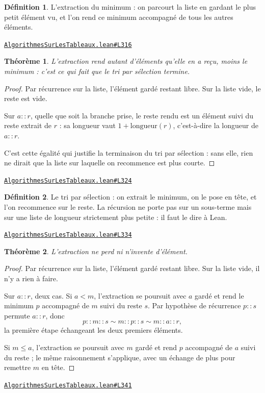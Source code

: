 \documentclass[11pt,a4paper]{article}
\theoremstyle{definition}
\newtheorem{definition}{Définition}
\theoremstyle{plain}
\newtheorem{theoreme}{Théorème}
\newcommand{\source}[2]{\par\smallskip\noindent\hfill{\footnotesize\href{#1}{\texttt{#2}}}\par\smallskip}
\begin{document}
\begin{definition}
L'extraction du minimum : on parcourt la liste en gardant le plus petit élément
vu, et l'on rend ce minimum accompagné de tous les autres éléments.
\end{definition}
\source{https://github.com/Commutator-IO/learn-lean/blob/main/courses/02-lycee/11-informatique-nsi/AlgorithmesSurLesTableaux.lean\#L316}{AlgorithmesSurLesTableaux.lean\#L316}

\begin{theoreme}
L'extraction rend autant d'éléments qu'elle en a reçu, moins le minimum : c'est
ce qui fait que le tri par sélection termine.
\end{theoreme}
\begin{proof}
Par récurrence sur la liste, l'élément gardé restant libre. Sur la liste vide, le reste
est vide.

Sur \(a :: r\), quelle que soit la branche prise, le reste rendu est un élément suivi du
reste extrait de \(r\) : sa longueur vaut \(1 + \mathrm{longueur}(r)\), c'est-à-dire la
longueur de \(a :: r\).

C'est cette égalité qui justifie la terminaison du tri par sélection : sans elle, rien
ne dirait que la liste sur laquelle on recommence est plus courte.
\end{proof}
\source{https://github.com/Commutator-IO/learn-lean/blob/main/courses/02-lycee/11-informatique-nsi/AlgorithmesSurLesTableaux.lean\#L324}{AlgorithmesSurLesTableaux.lean\#L324}

\begin{definition}
Le tri par sélection : on extrait le minimum, on le pose en tête, et l'on
recommence sur le reste. La récursion ne porte pas sur un sous-terme mais sur une
liste de longueur strictement plus petite : il faut le dire à Lean.
\end{definition}
\source{https://github.com/Commutator-IO/learn-lean/blob/main/courses/02-lycee/11-informatique-nsi/AlgorithmesSurLesTableaux.lean\#L334}{AlgorithmesSurLesTableaux.lean\#L334}

\begin{theoreme}
L'extraction ne perd ni n'invente d'élément.
\end{theoreme}
\begin{proof}
Par récurrence sur la liste, l'élément gardé restant libre. Sur la liste vide, il n'y a
rien à faire.

Sur \(a :: r\), deux cas. Si \(a < m\), l'extraction se poursuit avec \(a\) gardé et
rend le minimum \(p\) accompagné de \(m\) suivi du reste \(s\). Par hypothèse de
récurrence \(p :: s\) permute \(a :: r\), donc
\[ p :: m :: s \sim m :: p :: s \sim m :: a :: r , \]
la première étape échangeant les deux premiers éléments.

Si \(m \le a\), l'extraction se poursuit avec \(m\) gardé et rend \(p\) accompagné de
\(a\) suivi du reste ; le même raisonnement s'applique, avec un échange de plus pour
remettre \(m\) en tête.
\end{proof}
\source{https://github.com/Commutator-IO/learn-lean/blob/main/courses/02-lycee/11-informatique-nsi/AlgorithmesSurLesTableaux.lean\#L341}{AlgorithmesSurLesTableaux.lean\#L341}
\end{document}
